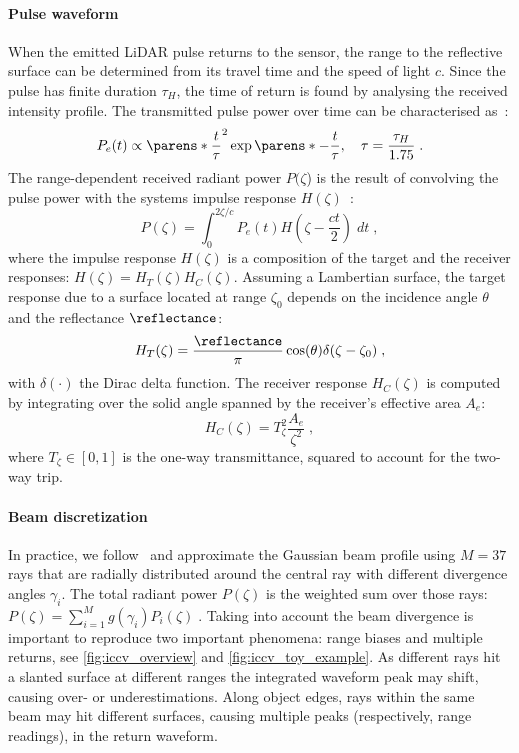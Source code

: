 \paragraph{Pulse waveform}
When the emitted LiDAR pulse returns to the sensor, the range to the reflective surface can be determined from its travel time and the speed of light $c$. Since the pulse has finite duration $\tau_H$, the time of return is found by analysing the received intensity profile. The transmitted pulse power over time can be characterised as~\cite{carlsson2001signature}:
\begin{equation}
    P_e(t) \propto \parens*{\frac{t}{\tau}}^2 \exp\parens*{-\frac{t}{\tau}},\quad \tau = \frac{\tau_H}{1.75}\;.
\label{eq:pulse}
\end{equation}
The range-dependent received radiant power $P(\zeta$) is the result of convolving the pulse power with the systems impulse response $H(\zeta)$~\cite{rasshofer2011influences,hahner2021fog,hahner2022lidar}:
\begin{equation}
    P(\zeta) = \int_0^{2\zeta/c} P_e(t) H(\zeta - \frac{ct}{2}) \; dt\;,
\end{equation}
where the impulse response $H(\zeta)$ is a composition of the target and the receiver responses: $H(\zeta) =  H_T(\zeta) H_C(\zeta)$.
Assuming a Lambertian surface, the target response due to a surface located at range $\zeta_0$ depends on the incidence angle $\theta$ and the reflectance $\reflectance$:
\begin{equation}
    H_T(\zeta) = \frac{\reflectance}{\pi} \cos(\theta) \delta(\zeta - \zeta_0)\;, 
\label{eq:ht}
\end{equation}
with $\delta(\cdot)$ the Dirac delta function.
The receiver response $H_C(\zeta)$ is computed by integrating over the solid angle spanned by the receiver's effective area $A_e$:
\begin{equation}
   H_C(\zeta) = T^2_{\zeta} \frac{A_e}{\zeta^2}\;,
\label{eq:hc}
\end{equation}
where $T_{\zeta} \in [0,1]$ is the one-way transmittance, squared to account for the two-way trip.


\paragraph{Beam discretization}
In practice, we follow~\cite{winiwarter2022virtual} and approximate the Gaussian beam profile using $M\!=\!37$ rays that are radially distributed around the central ray with different divergence angles $\gamma_i$. The total radiant power $P(\zeta)$ is the weighted sum over those rays: $P(\zeta) = \sum_{i=1}^M g(\gamma_i) P_i(\zeta)\;.$
Taking into account the beam divergence is important to reproduce two important phenomena: range biases and multiple returns, see \cref{fig:iccv_overview} and \cref{fig:iccv_toy_example}. As different rays hit a slanted surface at different ranges the integrated waveform peak may shift, causing over- or underestimations. Along object edges, rays within the same beam may hit different surfaces, causing multiple peaks (respectively, range readings), in the return waveform.


